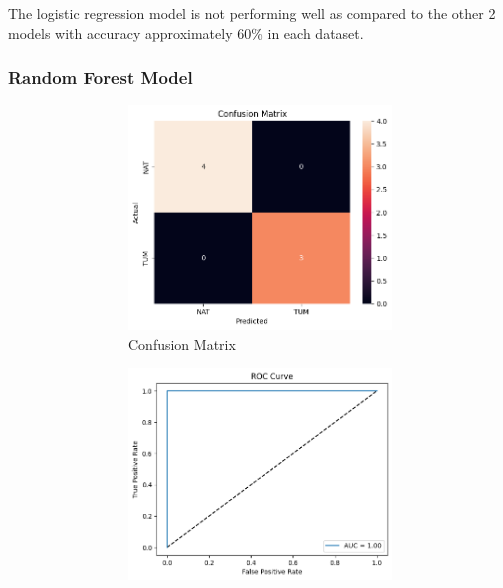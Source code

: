 \documentclass[a4paper,12pt]{article}
\begin{document}
The logistic regression model is not performing well as compared to the other 2 models with accuracy approximately 60\% in each dataset.
\subsubsection{Random Forest Model}
\begin{figure}[H]
	\centering

	\begin{subfigure}[b]{0.45\textwidth}
		\centering
		\begin{subfigure}[b]{0.49\textwidth}
			\centering
			\includegraphics[width=\textwidth]{images/2prc.png}  %
			\caption{Confusion Matrix}
			\label{fig:fig1}
		\end{subfigure}
		\hfill
		\begin{subfigure}[b]{0.49\textwidth}
			\centering
			\includegraphics[width=\textwidth]{images/2prr.png}  %

\end{subfigure}
\end{subfigure}
\end{figure}
\end{document}
